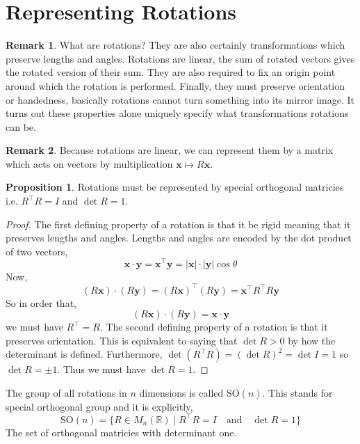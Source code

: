 \documentclass[12pt]{extarticle}
\newcommand{\R}{\mathbb{R}}
\theoremstyle{definition}
\newtheorem{proposition}[theorem]{Proposition}
\newtheorem{remark}{Remark}
\newenvironment{definition}[1][Definition:]{\begin{trivlist}
\item[\hskip \labelsep {\bfseries #1}]}{\end{trivlist}}
\renewcommand{\bf}[1]{\mathbf{#1}}
\newcommand{\SO}[1]{\mathrm{SO}\left(#1\right)}
\begin{document}
\section{Representing Rotations}

\begin{remark}
What are rotations? They are also certainly transformations which preserve lengths and angles. Rotations are linear, the sum of rotated vectors gives the rotated version of their sum. They are also required to fix an origin point around which the rotation is performed. Finally, they must preserve orientation or handedness, basically rotations cannot turn something into its mirror image. It turns out these properties alone uniquely specify what transformations rotations can be. 
\end{remark}

\begin{remark}
Because rotations are linear, we can represent them by a matrix which acts on vectors by multiplication $\bf{x} \mapsto R \bf{x}$.
\end{remark}

\begin{proposition}
Rotations must be represented by special orthogonal matricies i.e. $R^\top R = I$ and $\det{R} = 1$.
\end{proposition}

\begin{proof}
The first defining property of a rotation is that it be rigid meaning that it preserves lengths and angles. Lengths and angles are encoded by the dot product of two vectors,
\[ \bf{x} \cdot \bf{y} = \bf{x}^\top \bf{y} = |\bf{x}| \cdot |\bf{y}| \cos{\theta} \]
Now,
\[ (R \bf{x}) \cdot (R \bf{y}) = (R \bf{x})^\top (R \bf{y}) = \bf{x}^\top R^\top R \bf{y} \]
So in order that,
\[ (R \bf{x}) \cdot (R \bf{y}) = \bf{x} \cdot \bf{y} \]
we must have $R^\top = R$. The second defining property of a rotation is that it preserves orientation. This is equivalent to saying that $\det{R} > 0$ by how the determinant is defined. Furthermore, $\det{(R^{\top} R)} = (\det{R})^2 = \det{I} = 1$ so $\det{R} = \pm 1$. Thus we must have $\det{R} = 1$. 
\end{proof}

\begin{definition}
The group of all rotations in $n$ dimensions is called $\SO{n}$. This stands for special orthogonal group and it is explicitly,
\[ \SO{n} = \{ R \in M_{n}(\R) \mid R^\top R = I \quad \text{and} \quad \det{R} = 1 \} \]
The set of orthogonal matricies with determinant one. 
\end{definition}
\end{document}
